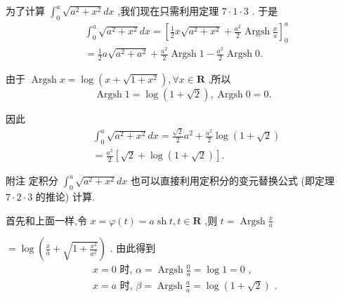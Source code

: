 为了计算 ${\int }_{0}^{a}\sqrt{{a}^{2} + {x}^{2}}{dx}$ ,我们现在只需利用定理 $7 \cdot  1 \cdot  3$ . 于是
\begin{align*}
	&{\int }_{0}^{a}\sqrt{{a}^{2} + {x}^{2}}{dx} = {\left\lbrack  \frac{1}{2}x\sqrt{{a}^{2} + {x}^{2}} + \frac{{a}^{2}}{2}\operatorname{Argsh}\frac{x}{a}\right\rbrack  }_{0}^{a}\\
	&= \frac{1}{2}a\sqrt{{a}^{2} + {a}^{2}} + \frac{{a}^{2}}{2}\operatorname{Argsh}1 - \frac{{a}^{2}}{2}\operatorname{Argsh}0.
\end{align*}

由于 $\operatorname{Argsh}x = \log \left( {x + \sqrt{1 + {x}^{2}}}\right) ,\forall x \in  \mathbf{R}$ ,所以
$$\operatorname{Argsh}1 = \log \left( {1 + \sqrt{2}}\right) ,\operatorname{Argsh}0 = 0.$$

因此
\begin{align*}
	&{\int }_{0}^{a}\sqrt{{a}^{2} + {x}^{2}}{dx} = \frac{\sqrt{2}}{2}{a}^{2} + \frac{{a}^{2}}{2}\log \left( {1 + \sqrt{2}}\right)\\
	&= \frac{{a}^{2}}{2}\left\lbrack  {\sqrt{2} + \log \left( {1 + \sqrt{2}}\right) }\right\rbrack  .
\end{align*}

附注 定积分 ${\int }_{0}^{a}\sqrt{{a}^{2} + {x}^{2}}{dx}$ 也可以直接利用定积分的变元替换公式 (即定理 $7 \cdot  2 \cdot  3$ 的推论) 计算.

首先和上面一样,令 $x = \varphi \left( t\right)  = a\operatorname{sh}t,t \in  \mathbf{R}$ ,则 $t = \operatorname{Argsh}\frac{x}{a}$

$= \log \left( {\frac{x}{a} + \sqrt{1 + \frac{{x}^{2}}{{a}^{2}}}}\right)$ . 由此得到
\begin{align*}
	&x = 0\text{ 时, }\alpha  = \operatorname{Argsh}\frac{0}{a} = \log 1 = 0\text{ , }\\
	&x = a\text{ 时, }\beta  = \operatorname{Argsh}\frac{a}{a} = \log \left( {1 + \sqrt{2}}\right) \text{ . }
\end{align*}

